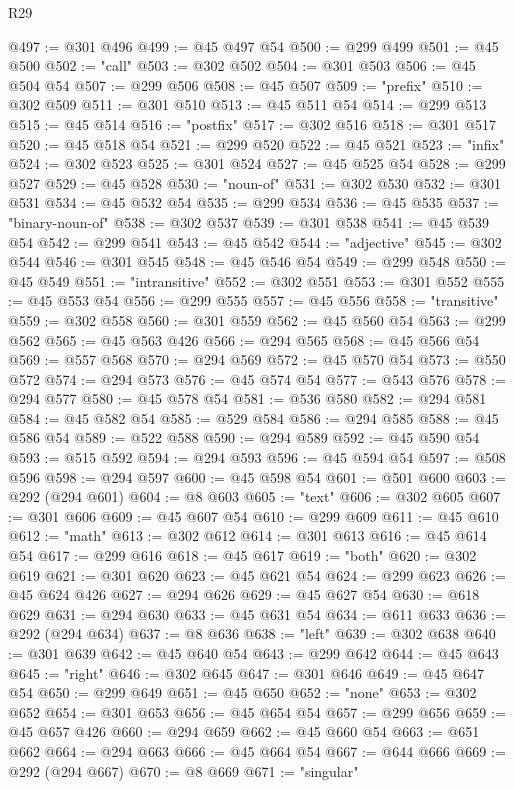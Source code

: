 \begin{lexlean}{R29}
\begin{coremodule}
@497 := @301 @496
@499 := @45 @497 @54
@500 := @299 @499
@501 := @45 @500
@502 := "call"
@503 := @302 @502
@504 := @301 @503
@506 := @45 @504 @54
@507 := @299 @506
@508 := @45 @507
@509 := "prefix"
@510 := @302 @509
@511 := @301 @510
@513 := @45 @511 @54
@514 := @299 @513
@515 := @45 @514
@516 := "postfix"
@517 := @302 @516
@518 := @301 @517
@520 := @45 @518 @54
@521 := @299 @520
@522 := @45 @521
@523 := "infix"
@524 := @302 @523
@525 := @301 @524
@527 := @45 @525 @54
@528 := @299 @527
@529 := @45 @528
@530 := "noun-of"
@531 := @302 @530
@532 := @301 @531
@534 := @45 @532 @54
@535 := @299 @534
@536 := @45 @535
@537 := "binary-noun-of"
@538 := @302 @537
@539 := @301 @538
@541 := @45 @539 @54
@542 := @299 @541
@543 := @45 @542
@544 := "adjective"
@545 := @302 @544
@546 := @301 @545
@548 := @45 @546 @54
@549 := @299 @548
@550 := @45 @549
@551 := "intransitive"
@552 := @302 @551
@553 := @301 @552
@555 := @45 @553 @54
@556 := @299 @555
@557 := @45 @556
@558 := "transitive"
@559 := @302 @558
@560 := @301 @559
@562 := @45 @560 @54
@563 := @299 @562
@565 := @45 @563 @426
@566 := @294 @565
@568 := @45 @566 @54
@569 := @557 @568
@570 := @294 @569
@572 := @45 @570 @54
@573 := @550 @572
@574 := @294 @573
@576 := @45 @574 @54
@577 := @543 @576
@578 := @294 @577
@580 := @45 @578 @54
@581 := @536 @580
@582 := @294 @581
@584 := @45 @582 @54
@585 := @529 @584
@586 := @294 @585
@588 := @45 @586 @54
@589 := @522 @588
@590 := @294 @589
@592 := @45 @590 @54
@593 := @515 @592
@594 := @294 @593
@596 := @45 @594 @54
@597 := @508 @596
@598 := @294 @597
@600 := @45 @598 @54
@601 := @501 @600
@603 := @292 (@294 @601)
@604 := @8 @603
@605 := "text"
@606 := @302 @605
@607 := @301 @606
@609 := @45 @607 @54
@610 := @299 @609
@611 := @45 @610
@612 := "math"
@613 := @302 @612
@614 := @301 @613
@616 := @45 @614 @54
@617 := @299 @616
@618 := @45 @617
@619 := "both"
@620 := @302 @619
@621 := @301 @620
@623 := @45 @621 @54
@624 := @299 @623
@626 := @45 @624 @426
@627 := @294 @626
@629 := @45 @627 @54
@630 := @618 @629
@631 := @294 @630
@633 := @45 @631 @54
@634 := @611 @633
@636 := @292 (@294 @634)
@637 := @8 @636
@638 := "left"
@639 := @302 @638
@640 := @301 @639
@642 := @45 @640 @54
@643 := @299 @642
@644 := @45 @643
@645 := "right"
@646 := @302 @645
@647 := @301 @646
@649 := @45 @647 @54
@650 := @299 @649
@651 := @45 @650
@652 := "none"
@653 := @302 @652
@654 := @301 @653
@656 := @45 @654 @54
@657 := @299 @656
@659 := @45 @657 @426
@660 := @294 @659
@662 := @45 @660 @54
@663 := @651 @662
@664 := @294 @663
@666 := @45 @664 @54
@667 := @644 @666
@669 := @292 (@294 @667)
@670 := @8 @669
@671 := "singular"

\end{coremodule}
\end{lexlean}
